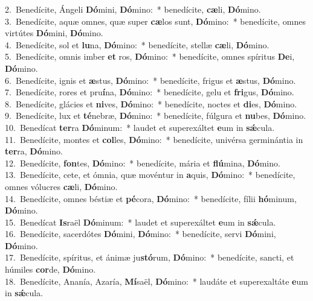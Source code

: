 {2.~}Benedícite, Ángeli \textbf{Dó}mini, \textbf{Dó}mino:~* benedícite, \textbf{cæ}li, \textbf{Dó}mino.\\
{3.~}Benedícite, aquæ omnes, quæ super \textbf{cæ}los sunt, \textbf{Dó}mino:~* benedícite, omnes virtútes \textbf{Dó}mini, \textbf{Dó}mino.\\
{4.~}Benedícite, sol et \textbf{lu}na, \textbf{Dó}mino:~* benedícite, stellæ \textbf{cæ}li, \textbf{Dó}mino.\\
{5.~}Benedícite, omnis imber \textbf{et} ros, \textbf{Dó}mino:~* benedícite, omnes spíritus \textbf{De}i, \textbf{Dó}mino.\\
{6.~}Benedícite, ignis et \textbf{æ}stus, \textbf{Dó}mino:~* benedícite, frigus et \textbf{æ}stus, \textbf{Dó}mino.\\
{7.~}Benedícite, rores et pru\textbf{í}na, \textbf{Dó}mino:~* benedícite, gelu et \textbf{fri}gus, \textbf{Dó}mino.\\
{8.~}Benedícite, glácies et \textbf{ni}ves, \textbf{Dó}mino:~* benedícite, noctes et \textbf{di}es, \textbf{Dó}mino.\\
{9.~}Benedícite, lux et \textbf{té}nebræ, \textbf{Dó}mino:~* benedícite, fúlgura et \textbf{nu}bes, \textbf{Dó}mino.\\
{10.~}Benedícat \textbf{ter}ra \textbf{Dó}minum:~* laudet et superexáltet \textbf{e}um in \textbf{sǽ}cula.\\
{11.~}Benedícite, montes et \textbf{col}les, \textbf{Dó}mino:~* benedícite, univérsa germinántia in \textbf{ter}ra, \textbf{Dó}mino.\\
{12.~}Benedícite, \textbf{fon}tes, \textbf{Dó}mino:~* benedícite, mária et \textbf{flú}mina, \textbf{Dó}mino.\\
{13.~}Benedícite, cete, et ómnia, quæ movéntur in \textbf{a}quis, \textbf{Dó}mino:~* benedícite, omnes vólucres \textbf{cæ}li, \textbf{Dó}mino.\\
{14.~}Benedícite, omnes béstiæ et \textbf{pé}cora, \textbf{Dó}mino:~* benedícite, fílii \textbf{hó}minum, \textbf{Dó}mino.\\
{15.~}Benedícat \textbf{Is}raël \textbf{Dó}minum:~* laudet et superexáltet \textbf{e}um in \textbf{sǽ}cula.\\
{16.~}Benedícite, sacerdótes \textbf{Dó}mini, \textbf{Dó}mino:~* benedícite, servi \textbf{Dó}mini, \textbf{Dó}mino.\\
{17.~}Benedícite, spíritus, et ánimæ ju\textbf{stó}rum, \textbf{Dó}mino:~* benedícite, sancti, et húmiles \textbf{cor}de, \textbf{Dó}mino.\\
{18.~}Benedícite, Ananía, Azaría, \textbf{Mí}saël, \textbf{Dó}mino:~* laudáte et superexaltáte \textbf{e}um in \textbf{sǽ}cula.\\
